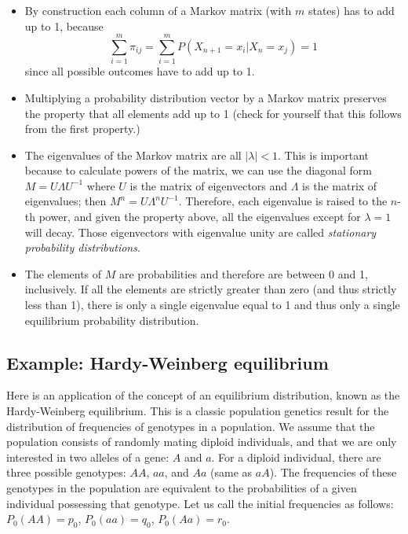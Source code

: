 \documentclass[
  letterpaper,
  DIV=11,
  numbers=noendperiod]{scrreprt}
\providecommand{\tightlist}{%
  \setlength{\itemsep}{0pt}\setlength{\parskip}{0pt}}\usepackage{longtable,booktabs,array}
\begin{document}
\begin{itemize}
\tightlist
\item
  By construction each column of a Markov matrix (with \(m\) states) has
  to add up to 1, because
  \[\sum_{i=1}^{m} \pi_{ij} = \sum_{i=1}^{m} P(X_{n+1} = x_i | X_n = x_j) = 1\]
  since all possible outcomes have to add up to 1.
\item
  Multiplying a probability distribution vector by a Markov matrix
  preserves the property that all elements add up to 1 (check for
  yourself that this follows from the first property.)
\item
  The eigenvalues of the Markov matrix are all \(|\lambda | <1\). This
  is important because to calculate powers of the matrix, we can use the
  diagonal form \(M = U \Lambda U^{-1}\) where \(U\) is the matrix of
  eigenvectors and \(\Lambda\) is the matrix of eigenvalues; then
  \(M^n = U \Lambda^n U^{-1}\). Therefore, each eigenvalue is raised to
  the \(n\)-th power, and given the property above, all the eigenvalues
  except for \(\lambda =1\) will decay. Those eigenvectors with
  eigenvalue unity are called \emph{stationary probability
  distributions}.
\item
  The elements of \(M\) are probabilities and therefore are between 0
  and 1, inclusively. If all the elements are strictly greater than zero
  (and thus strictly less than 1), there is only a single eigenvalue
  equal to 1 and thus only a single equilibrium probability
  distribution.
\end{itemize}

\subsection{Example: Hardy-Weinberg
equilibrium}\label{example-hardy-weinberg-equilibrium}

Here is an application of the concept of an equilibrium distribution,
known as the Hardy-Weinberg equilibrium. This is a classic population
genetics result for the distribution of frequencies of genotypes in a
population. We assume that the population consists of randomly mating
diploid individuals, and that we are only interested in two alleles of a
gene: \(A\) and \(a\). For a diploid individual, there are three
possible genotypes: \(AA\), \(aa\), and \(Aa\) (same as \(aA\)). The
frequencies of these genotypes in the population are equivalent to the
probabilities of a given individual possessing that genotype. Let us
call the initial frequencies as follows: \(P_0(AA) = p_0\),
\(P_0(aa) = q_0\), \(P_0(Aa) = r_0\).
\end{document}
